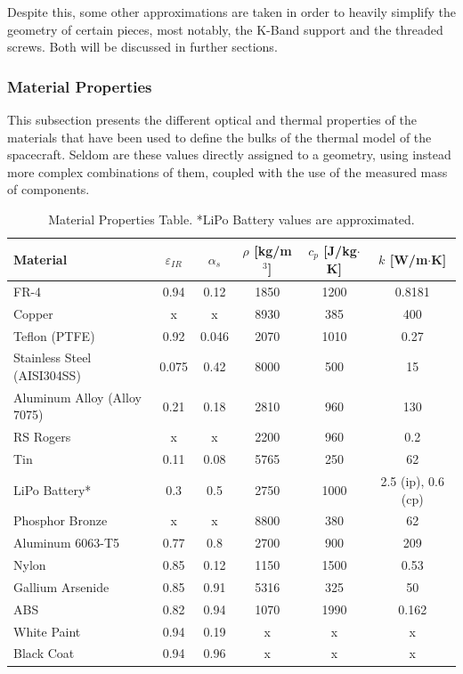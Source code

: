 Despite this, some other approximations are taken in order to heavily simplify the geometry of certain pieces,
most notably, the K-Band support and the threaded screws. Both will be discussed in further sections.

\subsubsection{Material Properties}

This subsection presents the different optical and thermal properties of the materials that have been used to
define the bulks of the thermal model of the spacecraft. Seldom are these values directly assigned to a geometry,
using instead more complex combinations of them, coupled with the use of the measured mass of components.

\begin{table}[H]
    \centering
    \begin{tabular}{lccccc}
        \toprule
        \textbf{Material} & \textbf{$\varepsilon_{IR}$} & \textbf{$\alpha_s$} & \textbf{$\rho$ [kg/m$^3$]} & \textbf{$c_p$ [J/kg$\cdot$K]} & \textbf{$k$ [W/m$\cdot$K]} \\
        \midrule
        FR-4 & 0.94 & 0.12 & 1850 & 1200 & 0.8181 \\
        Copper & x & x & 8930 & 385 & 400 \\
        Teflon (PTFE) & 0.92 & 0.046 & 2070 & 1010 & 0.27 \\
        Stainless Steel (AISI304SS) & 0.075 & 0.42 & 8000 & 500 & 15 \\
        Aluminum Alloy (Alloy 7075) & 0.21 & 0.18 & 2810 & 960 & 130 \\
        RS Rogers & x & x & 2200 & 960 & 0.2 \\
        Tin & 0.11 & 0.08 & 5765 & 250 & 62 \\
        LiPo Battery* & 0.3 & 0.5 & 2750 & 1000 & 2.5 (ip), 0.6 (cp) \\
        Phosphor Bronze & x & x & 8800 & 380 & 62 \\
        Aluminum 6063-T5 & 0.77 & 0.8 & 2700 & 900 & 209 \\
        Nylon & 0.85 & 0.12 & 1150 & 1500 & 0.53 \\
        Gallium Arsenide & 0.85 & 0.91 & 5316 & 325 & 50 \\
        ABS & 0.82 & 0.94 & 1070 & 1990 & 0.162 \\
        White Paint & 0.94 & 0.19 & x & x & x \\
        Black Coat & 0.94 & 0.96 & x & x & x \\
        \bottomrule
    \end{tabular}
    \caption{Material Properties Table. *LiPo Battery values are approximated.}
    \label{tab:material_properties}
\end{table}

